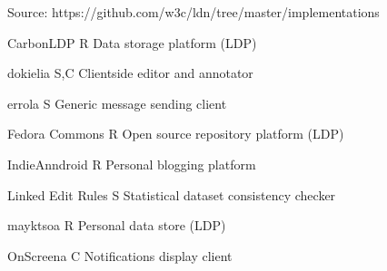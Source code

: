                                         
\par Source: \empty https://github.com/w3c/ldn/tree/master/implementations
                                    
                                
                                
                                    
                                        \empty CarbonLDP
                                        R
                                        Data storage platform (LDP)
                                    
                                    
                                        \empty dokielia
                                        S,C
                                        Clientside editor and annotator
                                    
                                    
                                        \empty errola
                                        S
                                        Generic message sending client
                                    
                                    
                                        \empty Fedora Commons
                                        R
                                        Open source repository platform (LDP)
                                    
                                    
                                        \empty IndieAnndroid
                                        R
                                        Personal blogging platform
                                    
                                    
                                        \empty Linked Edit Rules
                                        S
                                        Statistical dataset consistency checker
                                    
                                    
                                        \empty mayktsoa
                                        R
                                        Personal data store (LDP)
                                    
                                    
                                        \empty OnScreena
                                        C
                                        Notifications display client
                                    
